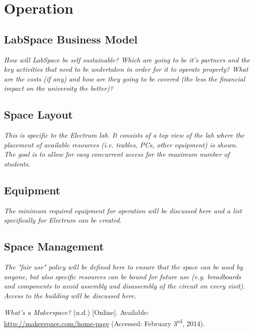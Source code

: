 \documentclass[a4paper, 11pt]{article}
\begin{document}
\section{Operation}

\subsection{LabSpace Business Model}
\textit{How will LabSpace be self sustainable? Which are going to be it's partners and the key activities that need to be undertaken in order for it to operate properly? What are the costs (if any) and how are they going to be covered (the less the financial impact on the university the better)?}

\subsection{Space Layout}
\textit{This is specific to the Electrum lab. It consists of a top view of the lab where the placement of available resources (i.e. teables, PCs, other equipment) is shown. The goal is  to allow for  easy concurrent access for the maximum number of students.}

\subsection{Equipment}
\textit{The minimum required equipment for operation will be discussed here and a list specifically for Electrum can be created.}

\subsection{Space Management}
\textit{The "fair use" policy will be defined here to ensure that the space can be used by anyone, but also specific resources can be bound for future use (e.g. breadboards and components to avoid assembly and disassembly of the circuit on every visit). Access to the building will be discussed here.}\cite{mobilehealth}

\newpage

\begin{thebibliography}{9}
     \emph{What’s a Makerspace?} (n.d.) [Online]. Available: \\ \href{http://makerspace.com/home-page}{http://makerspace.com/home-page} (Accessed: February 3\textsuperscript{rd}, 2014).
\end{thebibliography}
\end{document}

